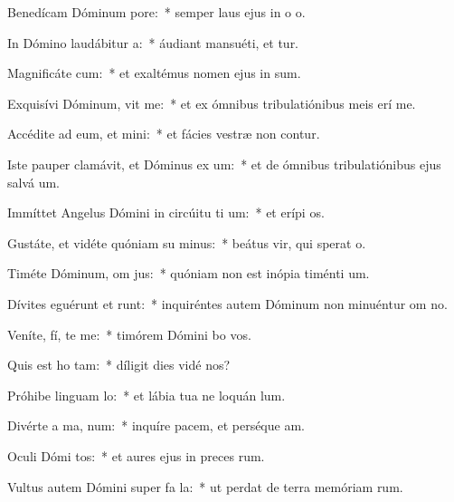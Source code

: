 \item Benedícam Dóminum   pore:~* semper laus ejus in o o.
\item In Dómino laudábitur  a:~* áudiant mansuéti, et tur.
\item Magnificáte  cum:~* et exaltémus nomen ejus in sum.
\item Exquisívi Dóminum,  vit me:~* et ex ómnibus tribulatiónibus meis erí me.
\item Accédite ad eum, et mini:~* et fácies vestræ non contur.
\item Iste pauper clamávit, et Dóminus ex um:~* et de ómnibus tribulatiónibus ejus salvá um.
\item Immíttet Angelus Dómini in circúitu ti um:~* et erípi os.
\item Gustáte, et vidéte quóniam su  minus:~* beátus vir, qui sperat  o.
\item Timéte Dóminum, om  jus:~* quóniam non est inópia timénti um.
\item Dívites eguérunt et runt:~* inquiréntes autem Dóminum non minuéntur om no.
\item Veníte, fí, te me:~* timórem Dómini bo vos.
\item Quis est ho   tam:~* díligit dies vidé nos?
\item Próhibe linguam   lo:~* et lábia tua ne loquán lum.
\item Divérte a ma,   num:~* inquíre pacem, et perséque am.
\item Oculi Dómi  tos:~* et aures ejus in preces rum.
\item Vultus autem Dómini super fa la:~* ut perdat de terra memóriam rum.
